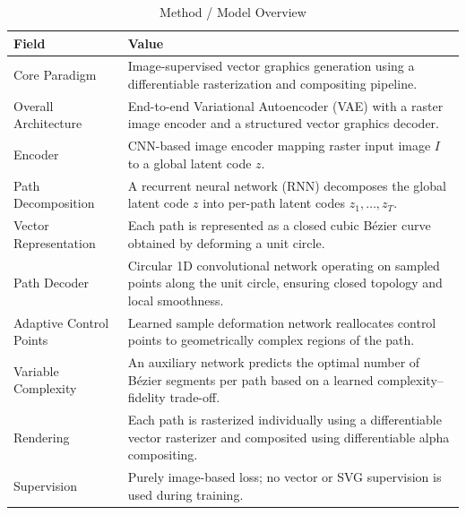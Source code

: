 \begin{table}[h!]
\centering
\caption{Method / Model Overview}
\begin{tabular}{|l|p{10cm}|}
\hline
\textbf{Field} & \textbf{Value} \\ \hline

Core Paradigm &
Image-supervised vector graphics generation using a differentiable rasterization and compositing pipeline. \\ \hline

Overall Architecture &
End-to-end Variational Autoencoder (VAE) with a raster image encoder and a structured vector graphics decoder. \\ \hline

Encoder &
CNN-based image encoder mapping raster input image $I$ to a global latent code $z$. \\ \hline

Path Decomposition &
A recurrent neural network (RNN) decomposes the global latent code $z$ into per-path latent codes $z_1, \dots, z_T$. \\ \hline

Vector Representation &
Each path is represented as a closed cubic Bézier curve obtained by deforming a unit circle. \\ \hline

Path Decoder &
Circular 1D convolutional network operating on sampled points along the unit circle, ensuring closed topology and local smoothness. \\ \hline

Adaptive Control Points &
Learned sample deformation network reallocates control points to geometrically complex regions of the path. \\ \hline

Variable Complexity &
An auxiliary network predicts the optimal number of Bézier segments per path based on a learned complexity–fidelity trade-off. \\ \hline

Rendering &
Each path is rasterized individually using a differentiable vector rasterizer and composited using differentiable alpha compositing. \\ \hline

Supervision &
Purely image-based loss; no vector or SVG supervision is used during training. \\ \hline

\end{tabular}
\end{table}


